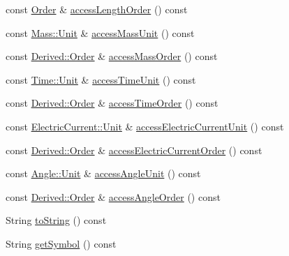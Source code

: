 \begin{DoxyCompactItemize}
\item 
const \hyperlink{classlibrary_1_1physics_1_1units_1_1_derived_1_1_order}{Order} \& \hyperlink{classlibrary_1_1physics_1_1units_1_1_derived_1_1_unit_ae7afd674029bece3fa430f96d378472f}{access\+Length\+Order} () const
\item 
const \hyperlink{classlibrary_1_1physics_1_1units_1_1_mass_a95f1e0434bc16794926b8e273bc2a54b}{Mass\+::\+Unit} \& \hyperlink{classlibrary_1_1physics_1_1units_1_1_derived_1_1_unit_a158968377ac0eaa7f61c37a49b4f7135}{access\+Mass\+Unit} () const
\item 
const \hyperlink{classlibrary_1_1physics_1_1units_1_1_derived_1_1_order}{Derived\+::\+Order} \& \hyperlink{classlibrary_1_1physics_1_1units_1_1_derived_1_1_unit_a5ec5da130ffa9412329d1a98a0575dec}{access\+Mass\+Order} () const
\item 
const \hyperlink{classlibrary_1_1physics_1_1units_1_1_time_ab876a6a05c9a2f28905f2753bfd64109}{Time\+::\+Unit} \& \hyperlink{classlibrary_1_1physics_1_1units_1_1_derived_1_1_unit_ac3537b9e186bc78b7d8ca405206cb272}{access\+Time\+Unit} () const
\item 
const \hyperlink{classlibrary_1_1physics_1_1units_1_1_derived_1_1_order}{Derived\+::\+Order} \& \hyperlink{classlibrary_1_1physics_1_1units_1_1_derived_1_1_unit_a641fb00c4d2cc7a62d95015459dfa9ef}{access\+Time\+Order} () const
\item 
const \hyperlink{classlibrary_1_1physics_1_1units_1_1_electric_current_a9498eabf964f0ae6116eb627b4ec5233}{Electric\+Current\+::\+Unit} \& \hyperlink{classlibrary_1_1physics_1_1units_1_1_derived_1_1_unit_a83d21cf2abde1e55c5e29c9e37541b29}{access\+Electric\+Current\+Unit} () const
\item 
const \hyperlink{classlibrary_1_1physics_1_1units_1_1_derived_1_1_order}{Derived\+::\+Order} \& \hyperlink{classlibrary_1_1physics_1_1units_1_1_derived_1_1_unit_aed0c89d08564dbc2ba7c29497bfc5f55}{access\+Electric\+Current\+Order} () const
\item 
const \hyperlink{classlibrary_1_1physics_1_1units_1_1_angle_a3c329d415a61783b16ce481874cc5956}{Angle\+::\+Unit} \& \hyperlink{classlibrary_1_1physics_1_1units_1_1_derived_1_1_unit_a93a5bd04df667ae87e71cdbba9cb7a9a}{access\+Angle\+Unit} () const
\item 
const \hyperlink{classlibrary_1_1physics_1_1units_1_1_derived_1_1_order}{Derived\+::\+Order} \& \hyperlink{classlibrary_1_1physics_1_1units_1_1_derived_1_1_unit_ab0973ccd11a78a33bb9303a15d886a2c}{access\+Angle\+Order} () const
\item 
String \hyperlink{classlibrary_1_1physics_1_1units_1_1_derived_1_1_unit_a57f476587f5e2de240bd264780da7a85}{to\+String} () const
\item 
String \hyperlink{classlibrary_1_1physics_1_1units_1_1_derived_1_1_unit_a9fd7bc67995542e49b73b2fe1b26e6ee}{get\+Symbol} () const
\end{DoxyCompactItemize}
